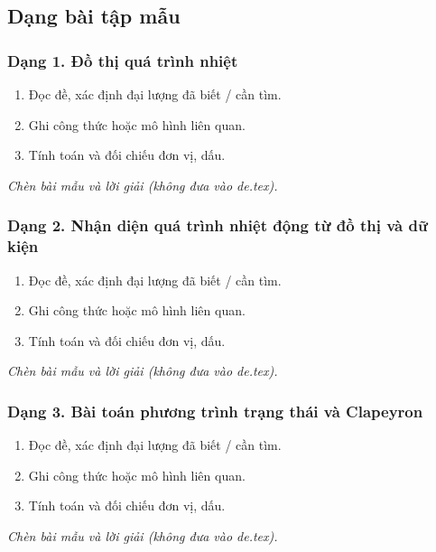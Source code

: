 

\subsection{Dạng bài tập mẫu}
\subsubsection{Dạng 1. Đồ thị quá trình nhiệt}
\begin{phuongphap}
\begin{enumerate}
\item Đọc đề, xác định đại lượng đã biết / cần tìm.
\item Ghi công thức hoặc mô hình liên quan.
\item Tính toán và đối chiếu đơn vị, dấu.
\end{enumerate}
\end{phuongphap}
\begin{vidumau}
\textit{Chèn bài mẫu và lời giải (không đưa vào de.tex).}
\end{vidumau}

\subsubsection{Dạng 2. Nhận diện quá trình nhiệt động từ đồ thị và dữ kiện}
\begin{phuongphap}
\begin{enumerate}
\item Đọc đề, xác định đại lượng đã biết / cần tìm.
\item Ghi công thức hoặc mô hình liên quan.
\item Tính toán và đối chiếu đơn vị, dấu.
\end{enumerate}
\end{phuongphap}
\begin{vidumau}
\textit{Chèn bài mẫu và lời giải (không đưa vào de.tex).}
\end{vidumau}

\subsubsection{Dạng 3. Bài toán phương trình trạng thái và Clapeyron}
\begin{phuongphap}
\begin{enumerate}
\item Đọc đề, xác định đại lượng đã biết / cần tìm.
\item Ghi công thức hoặc mô hình liên quan.
\item Tính toán và đối chiếu đơn vị, dấu.
\end{enumerate}
\end{phuongphap}
\begin{vidumau}
\textit{Chèn bài mẫu và lời giải (không đưa vào de.tex).}
\end{vidumau}

